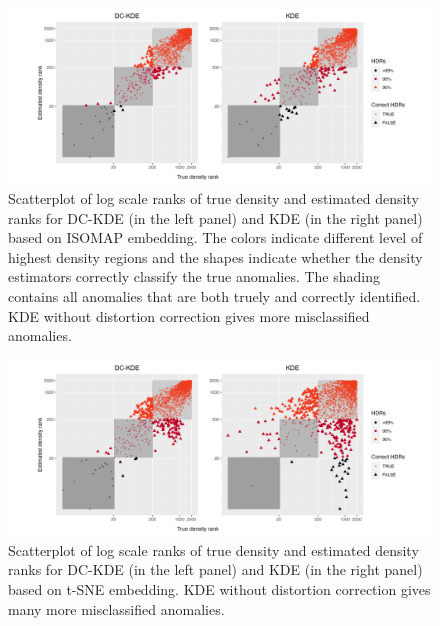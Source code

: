 \documentclass[11pt,a4paper,]{article}
\begin{document}
\begin{figure}

{\centering \includegraphics[width=1\linewidth]{figures/Twin Peak2000_densityrank_comparison_isomap_radius8_r0_5_logrank_rec_colprob_smallblocks3_crossfalse} 

}

\caption{Scatterplot of log scale ranks of true density and estimated density ranks for DC-KDE (in the left panel) and KDE (in the right panel) based on ISOMAP embedding. The colors indicate different level of highest density regions and the shapes indicate whether the density estimators correctly classify the true anomalies. The shading contains all anomalies that are both truely and correctly identified. KDE without distortion correction gives more misclassified anomalies.}\label{fig:tpisomapden}
\end{figure}

\begin{figure}

{\centering \includegraphics[width=1\linewidth]{figures/Twin Peak2000_densityrank_comparison_tsne_radius8_r0_5_logrank_rec_colprob_smallblocks3_crossfalse} 

}

\caption{Scatterplot of log scale ranks of true density and estimated density ranks for DC-KDE (in the left panel) and KDE (in the right panel) based on t-SNE embedding. KDE without distortion correction gives many more misclassified anomalies.}\label{fig:tptsneden}
\end{figure}
\end{document}
